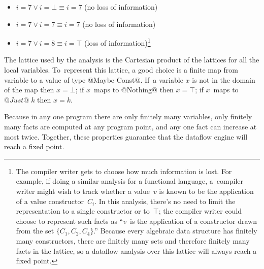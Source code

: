 \documentclass[blockstyle,preprint,nocopyrightspace]{sigplanconf}
\newcommand{\authornote}[1]{{\em #1}}
\def\authornote#1{\unskip\relax}
\newcommand{\simon}[1]{\authornote{SLPJ: #1}}
\newcommand{\norman}[1]{\authornote{NR: #1}}
\let\remark\norman
\begin{document}
\begin{itemize}
\item
$i = 7 \lor i=\bot \equiv i=7$ (no loss of information)
\item
$i = 7 \lor i= 7 \equiv  i=7$ (no loss of information)
\item
$i = 7 \lor i = 8 \equiv i = \top$ (loss of information)\footnote
{The compiler writer gets to choose how much information is lost.
For example, if doing a similar analysis for a functional language,
a~compiler writer might wish to track whether a value~$v$ is known to
be the application of a value constructor~$C_i$.
In this analysis, there's no need to limit the representation to a
single constructor or to~$\top$;
the compiler writer could choose to represent such facts as ``$v$~is
the application of a constructor drawn from the set $\{C_1, C_2,
C_4\}$.''
Because every algebraic data structure has finitely many constructors,
there are finitely many sets and therefore finitely many facts in the
lattice, so a dataflow analysis over this lattice will always reach a
fixed point.
}
\simon{What is ``the compiler''?  The library or the client?
Also the ``the logic implied by the representation of the dataflow facts cannot represent
disjunction''.  So we have the compiler, the logic, and the representation all swirling
about in my head.  I don't think we can fix my problem by a few words here; so out it goes.}
\remark{We'll try to get our terminology sorted.
Meanwhile, please let me know if the footnote adds anything. }
\simon{It's an improvement.}

\end{itemize}

The lattice  used by the analysis is the Cartesian product of the
lattices for all the local variables.
To~represent this lattice, a good choice is a finite map from variable
to a value of type @Maybe Const@.
If~a variable $x$ is not in the domain of the map then $x=\bot$;
if $x$~maps to @Nothing@ then $x=\top$; if $x$~maps to $@Just@\;k$ then
$x=k$.

Because in any one program there are only finitely many variables,
only finitely many facts are computed at any program point, 
and any one fact can increase at most twice.
Together, these properties
guarantee that the dataflow engine will
reach a fixed point.
\end{document}

